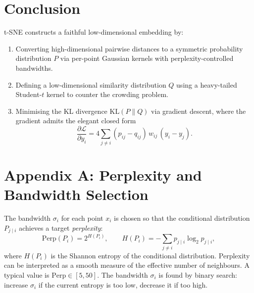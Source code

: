 \documentclass[11pt]{article}
\begin{document}
\section*{Conclusion}

t-SNE constructs a faithful low-dimensional embedding by:
\begin{enumerate}
  \item Converting high-dimensional pairwise distances to a symmetric probability
        distribution $P$ via per-point Gaussian kernels with perplexity-controlled
        bandwidths.
  \item Defining a low-dimensional similarity distribution $Q$ using a
        heavy-tailed Student-$t$ kernel to counter the crowding problem.
  \item Minimising the KL divergence $\mathrm{KL}(P\|Q)$ via gradient descent,
        where the gradient admits the elegant closed form
        \[
          \frac{\partial \mathcal{L}}{\partial y_i}
          = 4\sum_{j\neq i}(p_{ij} - q_{ij})\,w_{ij}\,(y_i - y_j).
        \]
\end{enumerate}

\begin{center}
\end{center}

\appendix
\section*{Appendix A: Perplexity and Bandwidth Selection}

The bandwidth $\sigma_i$ for each point $x_i$ is chosen so that the conditional
distribution $P_{j\mid i}$ achieves a target \emph{perplexity}:
\[
  \mathrm{Perp}(P_{i})
  = 2^{H(P_{i})},
  \qquad
  H(P_{i}) = -\sum_{j\neq i} p_{j\mid i}\log_2 p_{j\mid i},
\]
where $H(P_i)$ is the Shannon entropy of the conditional distribution.
Perplexity can be interpreted as a smooth measure of the effective number of
neighbours. A typical value is $\mathrm{Perp} \in [5, 50]$. The bandwidth
$\sigma_i$ is found by binary search: increase $\sigma_i$ if the current
entropy is too low, decrease it if too high.
\end{document}
